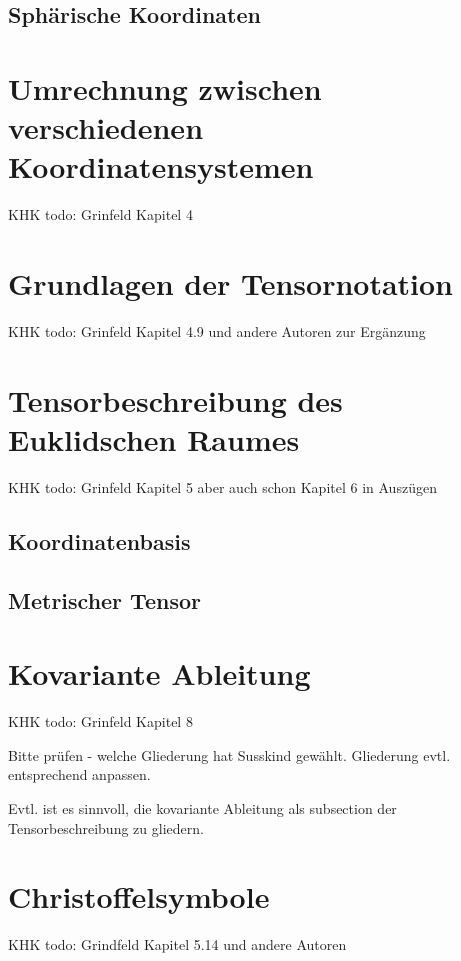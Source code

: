 \documentclass[11pt,a4paper]{article}
\begin{document}
\subsection{Sphärische Koordinaten}

\section{Umrechnung zwischen verschiedenen Koordinatensystemen}

KHK todo: Grinfeld Kapitel 4

\section{Grundlagen der Tensornotation}

KHK todo: Grinfeld Kapitel 4.9 und andere Autoren zur Ergänzung

\section{Tensorbeschreibung des Euklidschen Raumes}

KHK todo: Grinfeld Kapitel 5 aber auch schon Kapitel 6 in Auszügen
 
\subsection{Koordinatenbasis}

\subsection{Metrischer Tensor}

\section{Kovariante Ableitung}

KHK todo: Grinfeld Kapitel 8

Bitte prüfen - welche Gliederung hat Susskind gewählt. Gliederung evtl. entsprechend anpassen.

Evtl. ist es sinnvoll, die kovariante Ableitung als subsection der Tensorbeschreibung zu gliedern.

\section{Christoffelsymbole}

KHK todo: Grindfeld Kapitel 5.14 und andere Autoren
\end{document}
